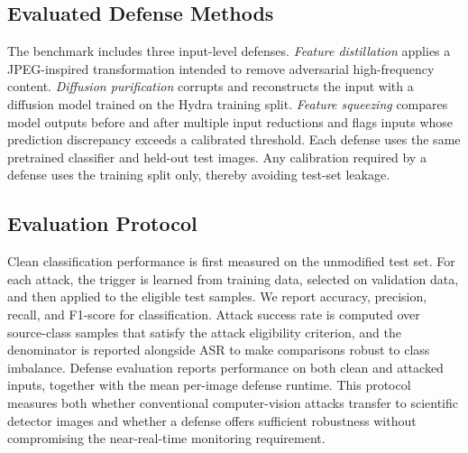 \subsection{Evaluated Defense Methods}

The benchmark includes three input-level defenses.  \emph{Feature
distillation} applies a JPEG-inspired transformation intended to remove
adversarial high-frequency content.  \emph{Diffusion purification} corrupts
and reconstructs the input with a diffusion model trained on the Hydra training
split.  \emph{Feature squeezing} compares model outputs before and after
multiple input reductions and flags inputs whose prediction discrepancy exceeds
a calibrated threshold.  Each defense uses the same pretrained classifier and
held-out test images.  Any calibration required by a defense uses the training
split only, thereby avoiding test-set leakage.

\subsection{Evaluation Protocol}

Clean classification performance is first measured on the unmodified test
set.  For each attack, the trigger is learned from training data, selected on
validation data, and then applied to the eligible test samples.  We report
accuracy, precision, recall, and F1-score for classification.  Attack success
rate is computed over source-class samples that satisfy the attack eligibility
criterion, and the denominator is reported alongside ASR to make comparisons
robust to class imbalance.  Defense evaluation reports performance on both
clean and attacked inputs, together with the mean per-image defense runtime.
This protocol measures both whether conventional computer-vision attacks
transfer to scientific detector images and whether a defense offers sufficient
robustness without compromising the near-real-time monitoring requirement.
